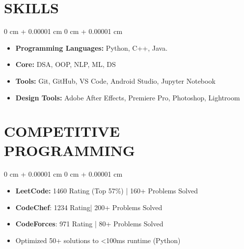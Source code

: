 \documentclass[10pt, letterpaper]{article}
\newenvironment{highlightsforbulletentries}{
    \begin{itemize}[
        topsep=0.10 cm,
        parsep=0.10 cm,
        partopsep=0pt,
        itemsep=0pt,
        leftmargin=10pt
    ]
}{
    \end{itemize}
} %
\newenvironment{onecolentry}{
    \begin{adjustwidth}{
        0 cm + 0.00001 cm
    }{
        0 cm + 0.00001 cm
    }
}{
    \end{adjustwidth}
} %
\begin{document}


    
    \section{SKILLS}

    \begin{onecolentry}
        \begin{highlightsforbulletentries}


        \item \textbf{Programming Languages:} Python, C++, Java.

        \item \textbf{Core:} DSA, OOP, NLP, ML, DS

        \item \textbf{Tools:} Git, GitHub, VS Code, Android Studio, Jupyter Notebook 

        \item \textbf{Design Tools:} Adobe After Effects, Premiere Pro, Photoshop, Lightroom


        \end{highlightsforbulletentries}
    \end{onecolentry}

    \section{COMPETITIVE PROGRAMMING}

    \begin{onecolentry}
        \begin{highlightsforbulletentries}


        \item  \textbf{LeetCode:} 1460 Rating (Top 57\%) | 160+ Problems Solved


        \item  \textbf{CodeChef}: 1234 Rating| 200+ Problems Solved

        \item \textbf{CodeForces}: 971 Rating | 80+ Problems Solved
        \item Optimized 50+ solutions to <100ms runtime (Python)

        \end{highlightsforbulletentries}
    \end{onecolentry}
\end{document}
